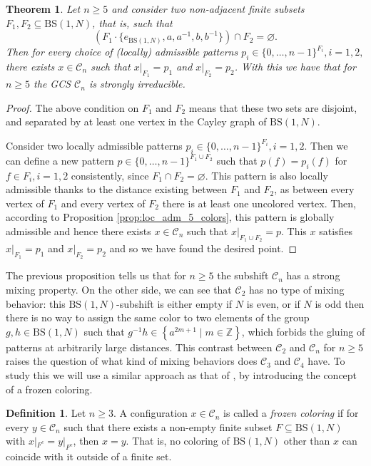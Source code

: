 \documentclass[letterpaper,11pt,reqno]{amsart}
\theoremstyle{plain}
\newtheorem{theorem}{Theorem}[section]
\theoremstyle{definition}
\newtheorem{definition}{Definition}[section]
\newcommand{\BS}[1][N]{\mathrm{BS}(1,#1)}
\begin{document}
\begin{theorem}\label{thm:gcs_mixing_n5} Let $n\ge 5$ and consider two non-adjacent finite subsets $F_1,F_2\subseteq \BS$, that is, such that 
	$$\left( F_1\cdot \{e_{\BS},a,a^{-1},b,b^{-1}\}\right)\cap F_2=\varnothing.$$
	Then for every choice of (locally) admissible patterns $p_i\in \{0,\ldots,n-1\}^{F_i}, i=1,2,$ there exists $x\in \mathcal{C}_n$ such that $x|_{F_1}=p_1$ and $x|_{F_2}=p_2$. With this we have that for $n\ge 5$ the GCS $\mathcal{C}_n$ is strongly irreducible.
\end{theorem}
\begin{proof}
	The above condition on $F_1$ and $F_2$ means that these two sets are disjoint, and separated by at least one vertex in the Cayley graph of $\BS$. 
	
	Consider two locally admissible patterns $p_i\in \{0,\ldots,n-1\}^{F_i}, i=1,2$. Then we can define a new pattern $p\in \{0,\ldots,n-1\}^{F_1\cup F_2}$ such that $p(f)=p_i(f)$ for $f\in F_i, i=1,2$ consistently, since $F_1\cap F_2=\varnothing.$ This pattern is also locally admissible thanks to the distance existing between $F_1$ and $F_2$, as between every vertex of $F_1$ and every vertex of $F_2$ there is at least one uncolored vertex. Then, according to Proposition \ref{prop:loc_adm_5_colors}, this pattern is globally admissible and hence there exists $x\in \mathcal{C}_n$ such that $x|_{F_1\cup F_2}=p$. This $x$ satisfies $x|_{F_1}=p_1$ and $x|_{F_2}=p_2$ and so we have found the desired point.
\end{proof}


The previous proposition tells us that for $n\ge 5$ the subshift $\mathcal{C}_n$ has a strong mixing property. On the other side, we can see that $\mathcal{C}_2$ has no type of mixing behavior: this $\BS$-subshift is either empty if $N$ is even, or if $N$ is odd then there is no way to assign the same color to two elements of the group $g,h\in \BS$ such that $g^{-1}h\in \left\{a^{2m+1}\mid m\in \mathbb{Z} \right\}$, which forbids the gluing of patterns at arbitrarily large distances. This contrast between $\mathcal{C}_2$ and $\mathcal{C}_n$ for $n\ge 5$ raises the question of what kind of mixing behaviors does $\mathcal{C}_3$ and $\mathcal{C}_4$ have. To study this we will use a similar approach as that of \cite{alon2019mixing}, by introducing the concept of a frozen coloring.
\begin{definition} Let $n\ge 3$. A configuration $x\in \mathcal{C}_n$ is called a \textit{frozen coloring} if for every $y\in \mathcal{C}_n$ such that there exists a non-empty finite subset $F\subseteq \BS$ with $x|_{F^c}=y|_{F^c}$, then $x= y$. That is, no coloring of $\BS$ other than $x$ can coincide with it outside of a finite set.
\end{definition}
\end{document}
